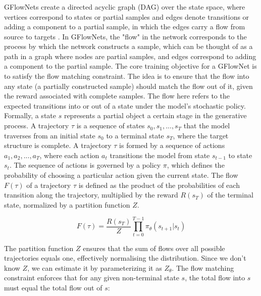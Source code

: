 \subsubsection{}\label{sec:gflownet}
GFlowNets create a directed acyclic graph (DAG) over the state space, where vertices correspond to states or partial samples and edges denote transitions or adding a component to a partial sample, in which the edges carry a flow from source to targets \cite{bengio2023gflownet, bengio_flow_2021}.
In GFlowNets, the "flow" in the network corresponds to the process by which the network constructs a sample, which can be thought of as a path in a graph where nodes are partial samples, and edges correspond to adding a component to the partial sample.
The core training objective for a GFlowNet is to satisfy the flow matching constraint. The idea is to ensure that the flow into any state (a partially constructed sample) should match the flow out of it, given the reward associated with complete samples. The flow here refers to the expected transitions into or out of a state under the model's stochastic policy. 
Formally, a state \( s \) represents a partial object a certain stage in the generative process. A trajectory \( \tau \) is a sequence of states \( s_0, s_1, ..., s_T \) that the model traverses from an initial state \( s_0 \) to a terminal state \( s_T \), where the target structure is complete.
A trajectory \( \tau \) is formed by a sequence of actions \( a_1, a_2, ..., a_T \), where each action \( a_t \) transitions the model from state \( s_{t-1} \) to state \( s_t \). The sequence of actions is governed by a policy \( \pi \), which defines the probability of choosing a particular action given the current state.
The flow \( F(\tau) \) of a trajectory \( \tau \) is defined as the product of the probabilities of each transition along the trajectory, multiplied by the reward \( R(s_T) \) of the terminal state, normalized by a partition function \( Z \).

\begin{equation} \label{eq:flow}
    F(\tau) = \frac{R(s_T)}{Z} \prod_{t=0}^{T-1} \pi_\theta(s_{t+1} | s_{t})
\end{equation}

The partition function \( Z \) ensures that the sum of flows over all possible trajectories equals one, effectively normalising the distribution. Since we don't know \( Z \), we can estimate it by parameterizing it as \( Z_{\theta} \).
The flow matching constraint enforces that for any given non-terminal state \( s \), the total flow into \( s \) must equal the total flow out of \( s \):

